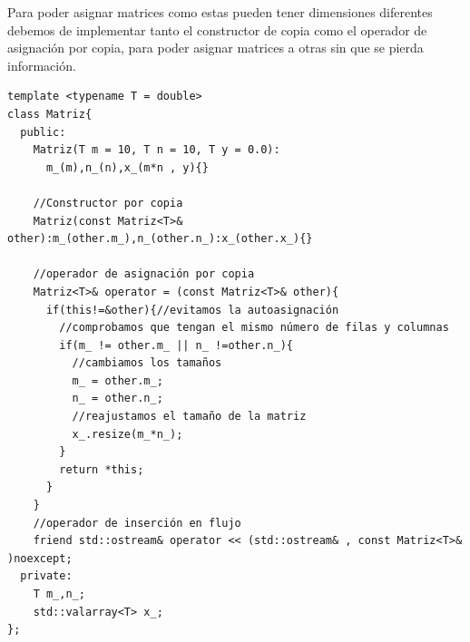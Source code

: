 Para poder asignar matrices como estas pueden tener dimensiones diferentes debemos de implementar tanto el constructor de copia como el operador de asignación por copia, para poder asignar matrices a otras sin que se pierda información.

\begin{verbatim}
template <typename T = double>
class Matriz{
  public:
    Matriz(T m = 10, T n = 10, T y = 0.0):
      m_(m),n_(n),x_(m*n , y){}

    //Constructor por copia
    Matriz(const Matriz<T>& other):m_(other.m_),n_(other.n_):x_(other.x_){}

    //operador de asignación por copia
    Matriz<T>& operator = (const Matriz<T>& other){
      if(this!=&other){//evitamos la autoasignación
        //comprobamos que tengan el mismo número de filas y columnas
        if(m_ != other.m_ || n_ !=other.n_){
          //cambiamos los tamaños
          m_ = other.m_;
          n_ = other.n_;
          //reajustamos el tamaño de la matriz
          x_.resize(m_*n_);
        }
        return *this;
      }
    }
    //operador de inserción en flujo
    friend std::ostream& operator << (std::ostream& , const Matriz<T>& )noexcept;
  private:
    T m_,n_;
    std::valarray<T> x_;
};

\end{verbatim}